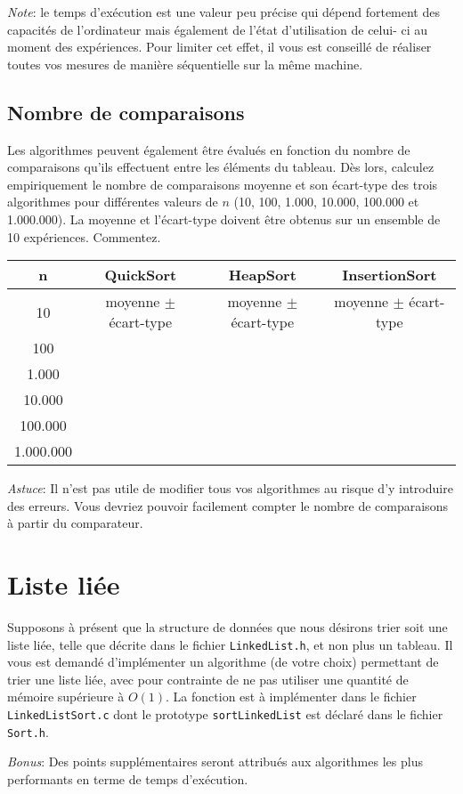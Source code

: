 \documentclass[a4paper,10pt]{article}
\begin{document}
{\em Note}: le temps d'exécution est une valeur peu précise qui dépend fortement
des capacités de l'ordinateur mais également de l'état d'utilisation de celui-
ci au moment des expériences. Pour limiter cet effet, il vous est conseillé
de réaliser toutes vos mesures de manière séquentielle sur la même machine.

\subsection{Nombre de comparaisons}

Les algorithmes peuvent également être évalués en fonction du nombre de
comparaisons qu'ils effectuent entre les éléments du tableau. Dès lors, calculez
empiriquement le nombre de comparaisons moyenne et son écart-type des trois
algorithmes pour différentes valeurs de $n$ (10, 100, 1.000, 10.000, 100.000 et
1.000.000). La moyenne et l'écart-type doivent être obtenus sur un ensemble de
10 expériences. Commentez.

\begin{center}
\begin{tabular}{cccc}
	\hline
	n & QuickSort & HeapSort & InsertionSort \\
	\hline
	10 & moyenne $\pm$ écart-type & moyenne $\pm$ écart-type & moyenne $\pm$ écart-type\\
	100 & & &\\
	1.000 & & &\\
	10.000 & & &\\
	100.000 & & &\\
	1.000.000 & & &\\
\end{tabular}
\end{center}

{\em Astuce}: Il n'est pas utile de modifier tous vos algorithmes au risque d'y
introduire des erreurs. Vous devriez pouvoir facilement compter le nombre de
comparaisons à partir du comparateur.

\section{Liste liée}

Supposons à présent que la structure de données que nous désirons trier soit une
liste liée, telle que décrite dans le fichier \texttt{LinkedList.h}, et non plus
un tableau. Il vous est demandé d'implémenter un algorithme (de votre choix)
permettant de trier une liste liée, avec pour contrainte de ne pas utiliser une
quantité de mémoire supérieure à $O(1)$. La fonction est à implémenter dans le
fichier \texttt{LinkedListSort.c} dont le prototype \texttt{sortLinkedList} est
déclaré dans le fichier \texttt{Sort.h}.

\textit{Bonus}:  Des points supplémentaires seront attribués aux algorithmes les plus
performants en terme de temps d'exécution.
\end{document}
